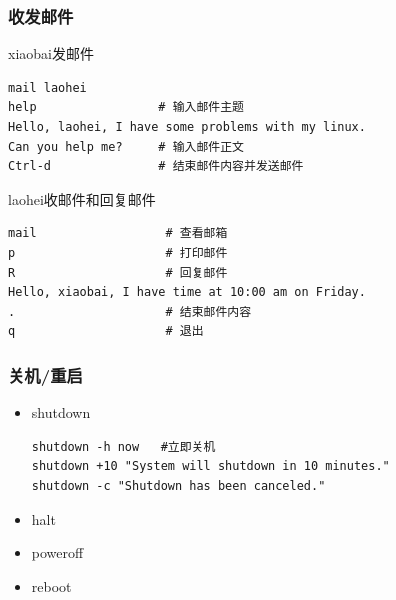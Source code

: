 \documentclass[xcolor=svgnames,presentation]{beamer}
\begin{document}
\begin{frame}[fragile]
\frametitle{收发邮件}
\label{sec-4-2-19}
\begin{block}{xiaobai发邮件}
\label{sec-4-2-19-1}


\begin{verbatim}
mail laohei
help                 # 输入邮件主题
Hello, laohei, I have some problems with my linux.
Can you help me?     # 输入邮件正文
Ctrl-d               # 结束邮件内容并发送邮件
\end{verbatim}
\end{block}
\begin{exampleblock}{laohei收邮件和回复邮件}
\label{sec-4-2-19-2}


\begin{verbatim}
mail                  # 查看邮箱
p                     # 打印邮件
R                     # 回复邮件
Hello, xiaobai, I have time at 10:00 am on Friday.
.                     # 结束邮件内容
q                     # 退出
\end{verbatim}
\end{exampleblock}
\end{frame}
\begin{frame}[fragile]
\frametitle{关机/重启}
\label{sec-4-2-20}
\begin{itemize}

\item shutdown\\
\label{sec-4-2-20-1}%
\begin{verbatim}
shutdown -h now   #立即关机
shutdown +10 "System will shutdown in 10 minutes."
shutdown -c "Shutdown has been canceled."
\end{verbatim}

\item halt
\label{sec-4-2-20-2}%

\item poweroff
\label{sec-4-2-20-3}%

\item reboot
\label{sec-4-2-20-4}%
\end{itemize} %
\end{frame}
\end{document}
